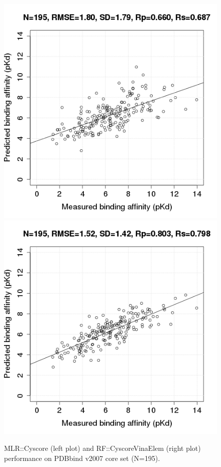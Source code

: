 \documentclass[journal=jacsat,manuscript=article]{achemso}
\begin{document}
\begin{figure}
\includegraphics[width=1.4\linewidth,natwidth=480,natheight=480]{../rfcyscore/x4/mlr/trn-247-tst-195-yp.png}
\endminipage\hfill
{}
\includegraphics[width=1.4\linewidth,natwidth=480,natheight=480]{../rfcyscore/x46/rf/trn-1105-tst-195-yp.png}
\endminipage\hfill
\caption{MLR::Cyscore (left plot) and RF::CyscoreVinaElem (right plot) performance on PDBbind v2007 core set (N=195).}
\label{fig:tst195}
\end{figure}
\end{document}
